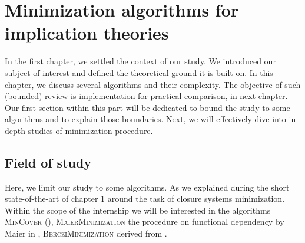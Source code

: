 \chapter{Minimization algorithms for implication theories}

In the first chapter, we settled the context of our study. We introduced our 
subject of interest and defined the theoretical ground it is built on. In this
chapter, we discuss several algorithms and their complexity. The objective of
such (bounded) review is implementation for practical comparison, in next 
chapter. Our first section within this part will be dedicated to bound the study
to some algorithms and to explain those boundaries. Next, we will effectively
dive into in-depth studies of minimization procedure. 

\section{Field of study}

Here, we limit our study to some algorithms. As we explained during
the short state-of-the-art of chapter 1 around the task of closure systems 
minimization. Within the scope of the internship we will be interested in the
algorithms \textsc{MinCover} (\cite{b._ganter_conceptual_2016}), 
\textsc{MaierMinimization} the procedure on functional dependency by Maier in 
\cite{david_minimum_1980, maier_theory_1983}, \textsc{BercziMinimization} 
derived from \cite{berczi_directed_2017}.

\vspace{1.2em}

